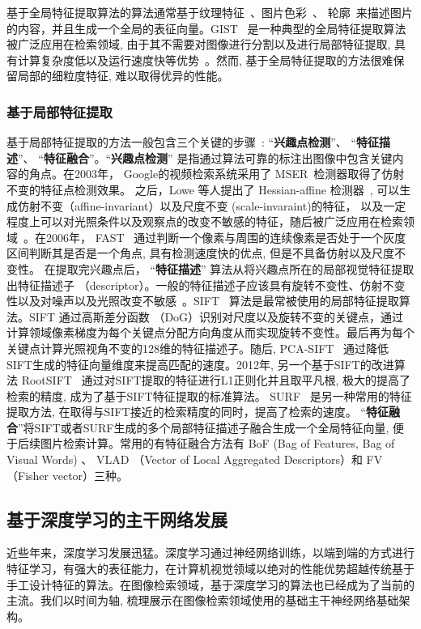 基于全局特征提取算法的算法通常基于纹理特征~\cite{park2002fast,wang2014content}、图片色彩~\cite{wang2011interactive}\cite{wengert2011bag}、 轮廓~\cite{wang2006large}来描述图片的内容，并且生成一个全局的表征向量。GIST~\cite{friedman1979framing,torralba2003context} 是一种典型的全局特征提取算法被广泛应用在检索领域, 由于其不需要对图像进行分割以及进行局部特征提取, 具有计算复杂度低以及运行速度快等优势~\cite{zhou2017recent}。然而, 基于全局特征提取的方法很难保留局部的细粒度特征, 难以取得优异的性能。
\subsubsection{基于局部特征提取}
基于局部特征提取的方法一般包含三个关键的步骤~\cite{zhou2017recent}: ``\textbf{兴趣点检测}''、 ``\textbf{特征描述}''、 ``\textbf{特征融合}''。``\textbf{兴趣点检测}'' 是指通过算法可靠的标注出图像中包含关键内容的角点。在2003年， Google的视频检索系统采用了 MSER~\cite{matas2004robust}检测器取得了仿射不变的特征点检测效果。 之后，Lowe 等人提出了 Hessian-affine 检测器~\cite{lowe2004distinctive}, 可以生成仿射不变（affine-invariant）以及尺度不变 (scale-invaraint)的特征， 以及一定程度上可以对光照条件以及观察点的改变不敏感的特征，随后被广泛应用在检索领域~\cite{philbin2007object}。在2006年， FAST~\cite{rosten2008faster} 通过判断一个像素与周围的连续像素是否处于一个灰度区间判断其是否是一个角点, 具有检测速度快的优点, 但是不具备仿射以及尺度不变性。 在提取完兴趣点后， ``\textbf{特征描述}'' 算法从将兴趣点所在的局部视觉特征提取出特征描述子 （descriptor）。一般的特征描述子应该具有旋转不变性、仿射不变性以及对噪声以及光照改变不敏感~\cite{zhou2017recent}。SIFT ~\cite{lowe2004distinctive}算法是最常被使用的局部特征提取算法。SIFT 通过高斯差分函数 （DoG）识别对尺度以及旋转不变的关键点，通过计算领域像素梯度为每个关键点分配方向角度从而实现旋转不变性。最后再为每个关键点计算光照视角不变的128维的特征描述子。随后, PCA-SIFT~\cite{ke2004pca} 通过降低SIFT生成的特征向量维度来提高匹配的速度。2012年, 另一个基于SIFT的改进算法 RootSIFT~\cite{arandjelovic2012three} 通过对SIFT提取的特征进行L1正则化并且取平凡根, 极大的提高了检索的精度, 成为了基于SIFT特征提取的标准算法。 SURF~\cite{bay2006surf} 是另一种常用的特征提取方法, 在取得与SIFT接近的检索精度的同时，提高了检索的速度。 ``\textbf{特征融合}''将SIFT或者SURF生成的多个局部特征描述子融合生成一个全局特征向量, 便于后续图片检索计算。常用的有特征融合方法有 BoF (Bag of Features, Bag of Visual Words) 、 VLAD （Vector of Local Aggregated Descriptors）和 FV （Fisher vector）三种。
\subsection{基于深度学习的主干网络发展}
近些年来，深度学习发展迅猛。深度学习通过神经网络训练，以端到端的方式进行特征学习，有强大的表征能力，在计算机视觉领域以绝对的性能优势超越传统基于手工设计特征的算法。在图像检索领域，基于深度学习的算法也已经成为了当前的主流。我们以时间为轴, 梳理展示在图像检索领域使用的基础主干神经网络基础架构。
